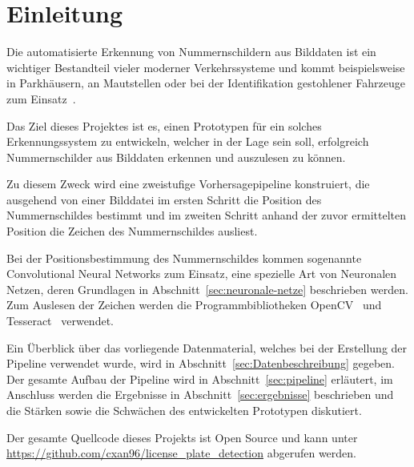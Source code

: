 \section{Einleitung}

Die automatisierte Erkennung von Nummernschildern aus Bilddaten
ist ein wichtiger Bestandteil vieler moderner Verkehrssysteme
und kommt beispielsweise in Parkh\"ausern, an Mautstellen
oder bei der Identifikation gestohlener Fahrzeuge zum
Einsatz~\cite{silva2018a}.

Das Ziel dieses Projektes ist es, einen Prototypen f\"ur ein solches
Erkennungssystem zu entwickeln, welcher in der
Lage sein soll, erfolgreich Nummernschilder aus Bilddaten erkennen
und auszulesen zu k\"onnen.

Zu diesem Zweck wird eine zweistufige Vorhersagepipeline konstruiert,
die ausgehend von einer Bilddatei im ersten Schritt die Position des
Nummernschildes bestimmt und im zweiten Schritt anhand der zuvor ermittelten
Position die Zeichen des Nummernschildes ausliest.

Bei der Positionsbestimmung des Nummernschildes kommen sogenannte
Convolutional Neural Networks zum Einsatz, eine spezielle Art von
Neuronalen Netzen, deren Grundlagen in Abschnitt~\ref{sec:neuronale-netze}
beschrieben werden. Zum Auslesen der Zeichen werden die
Programmbibliotheken OpenCV~\cite{opencv_library} und
Tesseract~\cite{tesseract} verwendet.

Ein \"Uberblick \"uber das vorliegende Datenmaterial, welches
bei der Erstellung der Pipeline verwendet wurde, wird in
Abschnitt~\ref{sec:Datenbeschreibung} gegeben.
Der gesamte Aufbau der Pipeline wird in Abschnitt~\ref{sec:pipeline}
erl\"autert, im Anschluss werden die Ergebnisse in Abschnitt~\ref{sec:ergebnisse}
beschrieben und die St\"arken sowie die Schw\"achen des entwickelten
Prototypen diskutiert.

Der gesamte Quellcode dieses Projekts ist Open Source und kann
unter \url{https://github.com/cxan96/license_plate_detection}
abgerufen werden.
